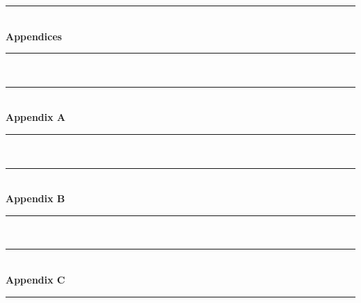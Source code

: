 \documentclass[a4paper]{IEEEtran}
\begin{document}
\clearpage
\begin{titlepage}
    \newcommand{\HRule}{\rule{\linewidth}{0.5mm}} %
    \center %
    \vspace*{3cm}
    \HRule \\[0.4cm]
    { \huge \bfseries Appendices}\\[0.4cm] %
    \HRule \\[1.5cm]
\end{titlepage}
\clearpage
\begin{titlepage}
    \newcommand{\HRule}{\rule{\linewidth}{0.5mm}} %
    \center %
    \vspace*{3cm}
    \HRule \\[0.4cm]
    { \huge \bfseries Appendix A}\\[0.4cm] %
    \HRule \\[1.5cm]
\end{titlepage}
%
\clearpage
\begin{titlepage}
    \newcommand{\HRule}{\rule{\linewidth}{0.5mm}} %
    \center %
    \vspace*{3cm}
    \HRule \\[0.4cm]
    { \huge \bfseries Appendix B}\\[0.4cm] %
    \HRule \\[1.5cm]
\end{titlepage}

\clearpage
\begin{titlepage}
    \newcommand{\HRule}{\rule{\linewidth}{0.5mm}} %
    \center %
    \vspace*{3cm}
    \HRule \\[0.4cm]
    { \huge \bfseries Appendix C}\\[0.4cm] %
    \HRule \\[1.5cm]
\end{titlepage}

\end{document}
